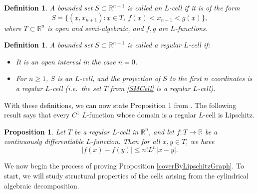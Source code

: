 \documentclass[letterpaper, reqno,11pt]{article}
\numberwithin{equation}{section}
\newcommand{\RR}{\mathbb{R}}
\numberwithin{thm}{section}
\newtheorem{prop}[thm]{Proposition}
\newtheorem{defn}[thm]{Definition}
\theoremstyle{remark}
\begin{document}
\begin{defn}\label{defnLCell}
A bounded set $S\subset\RR^{n+1}$ is called an $L$-\emph{cell} if it is of the form
\begin{equation}\label{SMCell}
S = \{(\underline x, x_{n+1})\colon \underline x \in T,\ f(\underline x)< x_{n+1}< g(\underline x) \},
\end{equation}
where $T\subset\RR^n$ is open and semi-algebraic, and $f,g$ are $L$-functions. 
\end{defn}

\begin{defn}\label{defnRegularLCell}
A bounded set $S\subset\RR^{n+1}$ is called a \emph{regular} $L$-\emph{cell} if:
\begin{itemize}
	\item It is an open interval in the case $n=0$.
	\item For $n\geq 1$, $S$ is an $L$-cell, and the projection of $S$ to the first $n$ coordinates is a regular $L$-cell (i.e.~the set $T$ from \eqref{SMCell} is a regular $L$-cell).
\end{itemize}
\end{defn}


With these definitions, we can now state Proposition 1 from \cite{Pawlucki}. The following result says that every $C^1$ $L$-function whose domain is a regular $L$-cell is Lipschitz.
\begin{prop}\label{LFunctionsAreAlmostLipschitz}
Let $T$ be a regular $L$-cell in $\RR^{n}$, and let $f\colon T\to\RR$ be a continuously differentiable $L$-function. Then for all $x,y\in T$, we have
\begin{equation}
|f(x) - f(y)| \leq n! L^n |x-y|.
\end{equation}
\end{prop}
We now begin the process of proving Proposition \ref{coverByLipschitzGraph}. To start, we will study structural properties of the cells arising from the cylindrical algebraic decomposition.
\end{document}
